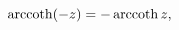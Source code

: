 \[\mathop{\mathrm{arccoth}\/}\nolimits\!\left(-z\right)=-\mathop{\mathrm{arccoth%
}\/}\nolimits z,\]